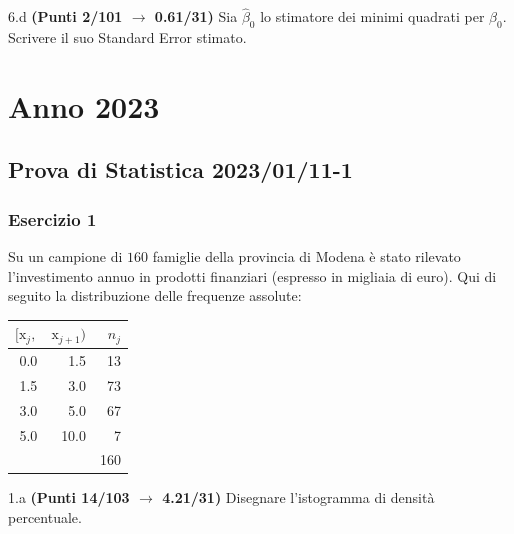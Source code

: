\documentclass[
  11pt,
]{book}
\theoremstyle{mytheoremstyle}
\theoremstyle{mydefstyle}
\begin{document}
6.d \textbf{(Punti 2/101 \(\rightarrow\) 0.61/31)} Sia \(\hat\beta_0\) lo stimatore dei minimi quadrati per \(\beta_0\).
Scrivere il suo Standard Error stimato.

\chapter{Anno 2023}\label{anno-2023}

\section{Prova di Statistica 2023/01/11-1}\label{prova-di-statistica-20230111-1}

\subsection{Esercizio 1}\label{esercizio-1-19}

Su un campione di \(160\) famiglie della provincia di Modena è stato rilevato l'investimento annuo in prodotti finanziari (espresso in migliaia di euro). Qui di seguito la distribuzione delle frequenze assolute:

\begin{table}[H]
\centering
\begin{tabular}{rrr}
\toprule
$[\text{x}_j,$ & $\text{x}_{j+1})$ & $n_j$\\
\midrule
0.0 & 1.5 & 13\\
1.5 & 3.0 & 73\\
3.0 & 5.0 & 67\\
5.0 & 10.0 & 7\\
 &  & 160\\
\bottomrule
\end{tabular}
\end{table}

1.a \textbf{(Punti 14/103 \(\rightarrow\) 4.21/31)} Disegnare l'istogramma di densità percentuale.
\end{document}
